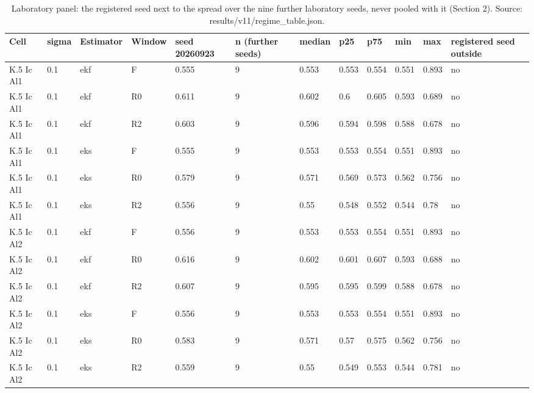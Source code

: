 \begin{table}[t]
\centering
\caption{Laboratory panel: the registered seed next to the spread over the nine further laboratory seeds, never pooled with it (Section 2). Source: results/v11/regime\_table.json.}
\label{tab:si-lab-seeds}
\footnotesize
\begin{tabular}{llllllllllll}
\toprule
Cell & sigma & Estimator & Window & seed 20260923 & n (further seeds) & median & p25 & p75 & min & max & registered seed outside \\
\midrule
K.5 Ic Al1 & 0.1 & ekf & F & 0.555 & 9 & 0.553 & 0.553 & 0.554 & 0.551 & 0.893 & no \\
K.5 Ic Al1 & 0.1 & ekf & R0 & 0.611 & 9 & 0.602 & 0.6 & 0.605 & 0.593 & 0.689 & no \\
K.5 Ic Al1 & 0.1 & ekf & R2 & 0.603 & 9 & 0.596 & 0.594 & 0.598 & 0.588 & 0.678 & no \\
K.5 Ic Al1 & 0.1 & eks & F & 0.555 & 9 & 0.553 & 0.553 & 0.554 & 0.551 & 0.893 & no \\
K.5 Ic Al1 & 0.1 & eks & R0 & 0.579 & 9 & 0.571 & 0.569 & 0.573 & 0.562 & 0.756 & no \\
K.5 Ic Al1 & 0.1 & eks & R2 & 0.556 & 9 & 0.55 & 0.548 & 0.552 & 0.544 & 0.78 & no \\
K.5 Ic Al2 & 0.1 & ekf & F & 0.556 & 9 & 0.553 & 0.553 & 0.554 & 0.551 & 0.893 & no \\
K.5 Ic Al2 & 0.1 & ekf & R0 & 0.616 & 9 & 0.602 & 0.601 & 0.607 & 0.593 & 0.688 & no \\
K.5 Ic Al2 & 0.1 & ekf & R2 & 0.607 & 9 & 0.595 & 0.595 & 0.599 & 0.588 & 0.678 & no \\
K.5 Ic Al2 & 0.1 & eks & F & 0.556 & 9 & 0.553 & 0.553 & 0.554 & 0.551 & 0.893 & no \\
K.5 Ic Al2 & 0.1 & eks & R0 & 0.583 & 9 & 0.571 & 0.57 & 0.575 & 0.562 & 0.756 & no \\
K.5 Ic Al2 & 0.1 & eks & R2 & 0.559 & 9 & 0.55 & 0.549 & 0.553 & 0.544 & 0.781 & no \\
\bottomrule
\end{tabular}
\end{table}
